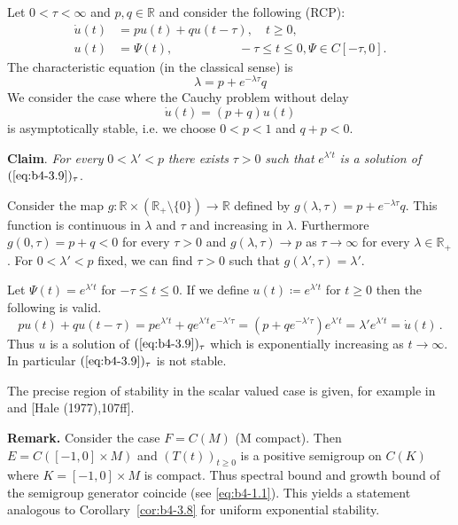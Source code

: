 	Let $0 < \tau < \infty$ and $p,q \in \mathbb{R}$ and consider the following (RCP):
	\begin{equation}\label{eq:b4-3.9}	\begin{aligned}
		\dot{u}(t) &= pu(t) + qu(t-\tau) , \quad t \geq 0 ,\\
		u(t) &= \Psi(t) , \quad\quad\quad\quad\quad\; -\tau \leq t \leq 0 , \Psi \in C[-\tau,0] .
	\end{aligned}
	\end{equation}
%
%
%
%
%
\newpage
%
The characteristic equation (in the classical sense) is 
\begin{equation}\label{eq:b4-3.10}
\lambda = p + e^{-\lambda\tau}q
\end{equation}
We consider the case where the Cauchy problem without delay
\[
\dot{u}(t) = (p + q)u(t)
\]
is asymptotically stable, i.e. we choose $0 < p < 1$ and $q + p < 0$.

\medskip\noindent
\textbf{Claim}.
	\textit{For every} $0 < \lambda' < p$ \textit{there exists} $\tau > 0$ \textit{such that} $e^{\lambda't}$ \textit{is a solution of} $(\ref{eq:b4-3.9})_{\tau}$.

\medskip 
Consider the map $g \colon \mathbb{R}\times(\mathbb{R}_{+}\setminus\{0\}) \to \mathbb{R}$ defined by $g(\lambda,\tau) = p + e^{-\lambda\tau}q$.
This function is continuous in $\lambda$ and $\tau$ and increasing in $\lambda$.
Furthermore $g(0,\tau) = p + q < 0$ for every $\tau > 0$ and $g(\lambda,\tau) \to p$ as $\tau \to \infty$ for every $\lambda \in \mathbb{R}_{+}$.
For $0 < \lambda' < p$ fixed, we can find $\tau > 0$ such that $g(\lambda',\tau) = \lambda'$.

Let $\Psi(t) = e^{\lambda't}$ for $-\tau \leq t \leq 0$. 
If we define $u(t) \coloneq e^{\lambda't}$ for $t \geq 0$ then the following is valid.
\[
pu(t) + qu(t-\tau) = pe^{\lambda't} + qe^{\lambda't}e^{-\lambda'\tau} = (p+qe^{-\lambda'\tau})e^{\lambda't} = \lambda'e^{\lambda't} = \dot{u}(t)\,.
\]
Thus $u$ is a solution of $(\ref{eq:b4-3.9})_{\tau}$ which is exponentially increasing as $t \to \infty$. 
In particular $(\ref{eq:b4-3.9})_{\tau}$ is not stable.

The precise region of stability in the scalar valued case is given, for example in \citet{hadeler:1978} and [Hale (1977),107ff].

\medskip\noindent
\textbf{Remark.}
	Consider the case $F = C(M)$ (M compact).
	Then $E = C([-1,0] \times M)$ and $(T(t))_{t\geq0}$ is a positive semigroup on $C(K)$ where $K = [-1,0] \times M$ is compact. 
	Thus spectral bound and growth bound of the semigroup generator coincide (see \ref{eq:b4-1.1}). 
	This yields a statement analogous to Corollary~\ref{cor:b4-3.8} for uniform exponential stability.

